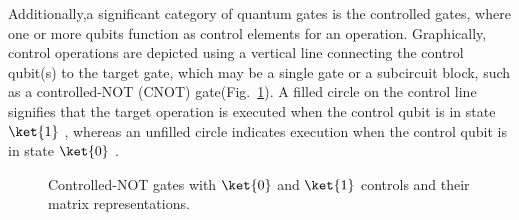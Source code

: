 \documentclass{article}
\begin{document}
Additionally,a significant category of quantum gates is the controlled gates, where one or more qubits function as control elements for an operation.
Graphically, control operations are depicted using a vertical line connecting the control qubit(s) to the target gate, which may be a single gate or a subcircuit block, such as a controlled-NOT (CNOT) gate(Fig.~\ref{fig:controlled-gates}).
A filled circle on the control line signifies that the target operation is executed when the control qubit is in state $\ket{1}$ , whereas an unfilled circle indicates execution when the control qubit is in state $\ket{0}$ .
\begin{figure}[htbp]
  \centering
  \hspace{1cm}
  \caption{Controlled-NOT gates with $\ket{0}$ and $\ket{1}$ controls and their matrix representations.}\label{fig:controlled-gates}
\end{figure}
\end{document}
